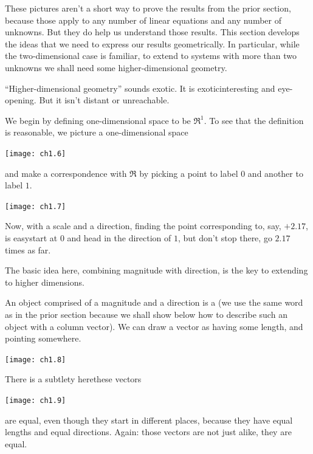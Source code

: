 These pictures aren't a short way to prove
the results from the prior section, because those apply
to any number of linear equations and any number of unknowns. 
But they do help us understand those results.
This section develops the ideas that we need to
express our results geometrically. 
In particular, while
the two-dimensional case is familiar, to extend to systems with
more than two unknowns we shall need some higher-dimensional geometry.














``Higher-dimensional geometry'' sounds exotic.
It is exotic\Dash interesting and eye-opening.
But it isn't distant or unreachable.

We begin by defining one-dimensional space to be \( \Re^1 \).
To see that the definition is reasonable, 
we picture a one-dimensional space
\begin{center}
  \texttt{[image: ch1.6]}
\end{center}
and make a correspondence with \( \Re \) by
picking a point to label $0$ and another to label $1$.
\begin{center}
  \texttt{[image: ch1.7]}
\end{center}
Now, with a scale and a direction,
finding the point corresponding to, say,
\( +2.17 \), is easy\Dash start at \( 0 \) and head in the direction of \( 1 \),
but don't stop there, go \( 2.17 \) times as far.

The basic idea here, combining magnitude with direction, is the
key to extending to higher dimensions.

An object comprised of a magnitude and a direction is a
(we use the same word as in the prior section because we shall show
below how to describe such
an object with a column vector).
We can draw a vector as having some length, and pointing somewhere.
\begin{center}
  \texttt{[image: ch1.8]}
\end{center}
There is a subtlety here\Dash these vectors
\begin{center}
  \texttt{[image: ch1.9]}
\end{center}
are equal, even though they start in different places,
because they have equal lengths and equal directions.
Again: those vectors are not just alike, they are equal.

